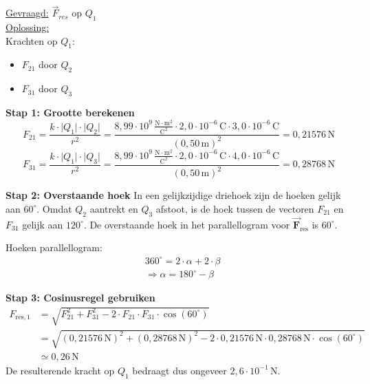 \documentclass{ximera}
\begin{document}
\begin{exercise}
\begin{solution}
        \underline{Gevraagd:} $\vec{F}_{res}$ op $Q_{1}$ \\

        \underline{Oplossing:}\\
        Krachten op $Q_{1}$:  
        \begin{itemize}
            \item $F_{21}$ door $Q_{2}$  
            \item $F_{31}$ door $Q_{3}$  
        \end{itemize}

        \textbf{Stap 1: Grootte berekenen}  
        \[
            F_{21} = \frac{k \cdot \lvert Q_{1}\rvert \cdot\lvert Q_{2}\rvert}{r^{2}} = 
            \frac{8{,}99 \cdot 10^9 \, \mathrm{\frac{N \cdot m^2}{C^2}} \cdot 2{,}0 \cdot 10^{-6} \, \mathrm{C} \cdot 3{,}0 \cdot 10^{-6} \, \mathrm{C}}{(0{,}50 \, \mathrm{m})^{2}} 
            = 0{,}21576 \, \mathrm{N}
        \]
        \[
            F_{31} = \frac{k \cdot \lvert Q_{1}\rvert \cdot \lvert Q_{3}\rvert}{r^{2}} = 
            \frac{8{,}99 \cdot 10^9 \, \mathrm{\frac{N \cdot m^2}{C^2}} \cdot 2{,}0 \cdot 10^{-6} \, \mathrm{C} \cdot 4{,}0 \cdot 10^{-6} \, \mathrm{C}}{(0{,}50 \, \mathrm{m})^{2}} 
            = 0{,}28768 \, \mathrm{N}
        \]

        \textbf{Stap 2: Overstaande hoek}  
        In een gelijkzijdige driehoek zijn de hoeken gelijk aan $60^\circ$. Omdat $Q_2$ aantrekt en $Q_3$ afstoot, is de hoek tussen de vectoren $F_{21}$ en $F_{31}$ gelijk aan $120^\circ$. De overstaande hoek in het parallellogram voor $\vec{\mathbf{F}}_{\text{res}}$ is $60^\circ$.
        \begin{hint}
            Hoeken parallellogram:
                \begin{align*}
                    &360^\circ=2\cdot\alpha+2\cdot\beta\\
                    &\Rightarrow \alpha = 180^\circ - \beta
                \end{align*}
        \end{hint}
        \textbf{Stap 3: Cosinusregel gebruiken}  
        \begin{align*}
            F_{\text{res},1} &= \sqrt{F_{21}^{2} + F_{31}^{2} - 2 \cdot F_{21} \cdot F_{31}\cdot \cos(60^\circ)}\\
            &= \sqrt{(0{,}21576 \, \mathrm{N})^{2}+(0{,}28768 \, \mathrm{N})^{2}-2\cdot 0{,}21576 \, \mathrm{N} \cdot 0{,}28768 \, \mathrm{N} \cdot \cos(60^\circ)}\\
            &\simeq \boxed{0{,}26 \, \mathrm{N}}
        \end{align*}
        De resulterende kracht op $Q_{1}$ bedraagt dus ongeveer $2{,}6 \cdot 10^{-1} \, \mathrm{N}$.
    \end{solution}
\end{exercise}
\end{document}
